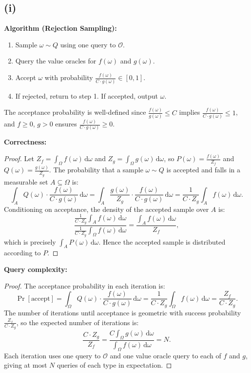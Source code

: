 \documentclass[12pt]{article}
\begin{document}
\subsection*{(i)}

\textbf{Algorithm (Rejection Sampling):}
\begin{enumerate}
\item Sample $\omega \sim Q$ using one query to $\mathcal{O}$.
\item Query the value oracles for $f(\omega)$ and $g(\omega)$.
\item Accept $\omega$ with probability $\frac{f(\omega)}{C \cdot g(\omega)} \in [0,1]$.
\item If rejected, return to step 1. If accepted, output $\omega$.
\end{enumerate}

The acceptance probability is well-defined since $\frac{f(\omega)}{g(\omega)} \leq C$ implies $\frac{f(\omega)}{C \cdot g(\omega)} \leq 1$, and $f \geq 0$, $g > 0$ ensures $\frac{f(\omega)}{C \cdot g(\omega)} \geq 0$.

\textbf{Correctness:}
\begin{proof}
Let $Z_f = \int_\Omega f(\omega)\,\mathrm{d}\omega$ and $Z_g = \int_\Omega g(\omega)\,\mathrm{d}\omega$, so $P(\omega) = \frac{f(\omega)}{Z_f}$ and $Q(\omega) = \frac{g(\omega)}{Z_g}$. The probability that a sample $\omega \sim Q$ is accepted and falls in a measurable set $A \subseteq \Omega$ is:
\[
\int_A Q(\omega) \cdot \frac{f(\omega)}{C \cdot g(\omega)}\,\mathrm{d}\omega = \int_A \frac{g(\omega)}{Z_g} \cdot \frac{f(\omega)}{C \cdot g(\omega)}\,\mathrm{d}\omega = \frac{1}{C \cdot Z_g} \int_A f(\omega)\,\mathrm{d}\omega.
\]
Conditioning on acceptance, the density of the accepted sample over $A$ is:
\[
\frac{\frac{1}{C \cdot Z_g} \int_A f(\omega)\,\mathrm{d}\omega}{\frac{1}{C \cdot Z_g} \int_\Omega f(\omega)\,\mathrm{d}\omega} = \frac{\int_A f(\omega)\,\mathrm{d}\omega}{Z_f},
\]
which is precisely $\int_A P(\omega)\,\mathrm{d}\omega$. Hence the accepted sample is distributed according to $P$.
\end{proof}

\textbf{Query complexity:}
\begin{proof}
The acceptance probability in each iteration is:
\[
\Pr[\text{accept}] = \int_\Omega Q(\omega) \cdot \frac{f(\omega)}{C \cdot g(\omega)}\,\mathrm{d}\omega = \frac{1}{C \cdot Z_g} \int_\Omega f(\omega)\,\mathrm{d}\omega = \frac{Z_f}{C \cdot Z_g}.
\]
The number of iterations until acceptance is geometric with success probability $\frac{Z_f}{C \cdot Z_g}$, so the expected number of iterations is:
\[
\frac{C \cdot Z_g}{Z_f} = \frac{C \int_\Omega g(\omega)\,\mathrm{d}\omega}{\int_\Omega f(\omega)\,\mathrm{d}\omega} = N.
\]
Each iteration uses one query to $\mathcal{O}$ and one value oracle query to each of $f$ and $g$, giving at most $N$ queries of each type in expectation.
\end{proof}
\end{document}
